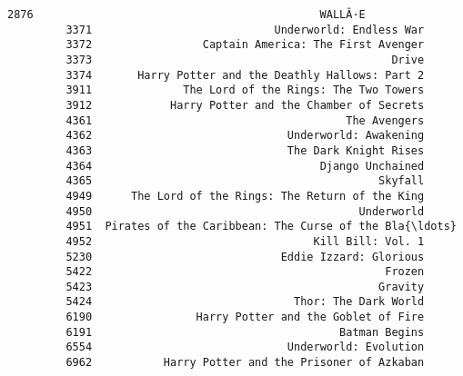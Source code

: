 \documentclass[11pt]{article}
\begin{document}
\begin{Verbatim}[commandchars=\\\{\}]
         2876                                            WALLÂ·E   
         3371                            Underworld: Endless War   
         3372                 Captain America: The First Avenger   
         3373                                              Drive   
         3374       Harry Potter and the Deathly Hallows: Part 2   
         3911              The Lord of the Rings: The Two Towers   
         3912            Harry Potter and the Chamber of Secrets   
         4361                                       The Avengers   
         4362                              Underworld: Awakening   
         4363                              The Dark Knight Rises   
         4364                                   Django Unchained   
         4365                                            Skyfall   
         4949      The Lord of the Rings: The Return of the King   
         4950                                         Underworld   
         4951  Pirates of the Caribbean: The Curse of the Bla{\ldots}   
         4952                                  Kill Bill: Vol. 1   
         5230                             Eddie Izzard: Glorious   
         5422                                             Frozen   
         5423                                            Gravity   
         5424                               Thor: The Dark World   
         6190                Harry Potter and the Goblet of Fire   
         6191                                      Batman Begins   
         6554                              Underworld: Evolution   
         6962           Harry Potter and the Prisoner of Azkaban   
         

\end{Verbatim}
\end{document}
